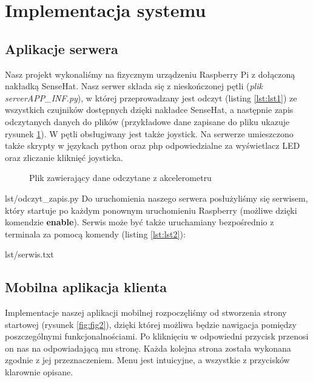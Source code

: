 \documentclass[11pt, a4paper]{article}
\begin{document}
\newpage

\section{Implementacja systemu}

\subsection{Aplikacje serwera}
Nasz projekt wykonaliśmy na fizycznym urządzeniu Raspberry Pi z dołączoną nakładką SenseHat. Nasz serwer składa się z nieskończonej pętli (\textit{plik serverAPP\_INF.py}), w której przeprowadzany jest odczyt (listing \ref{lst:lst1}) ze wszystkich czujników dostępnych dzięki nakładce SenseHat, a następnie zapis odczytanych danych do plików (przykładowe dane zapisane do pliku ukazuje rysunek \ref{fig:fig1}). W pętli obsługiwany jest także joystick. Na serwerze umieszczono także skrypty w językach python oraz php odpowiedzialne za wyświetlacz LED oraz zliczanie kliknięć joysticka. 

\begin{figure}[H]
	\caption{Plik zawierający dane odczytane z akcelerometru}
	\label{fig:fig1}
\end{figure}


{lst/odczyt_zapis.py}
Do uruchomienia naszego serwera posłużyliśmy się serwisem, który startuje po każdym ponownym uruchomieniu Raspberry (możliwe dzięki komendzie \textbf{enable}). Serwis może być także uruchamiany bezpośrednio z terminala za pomocą komendy (listing \ref{lst:lst2}):

{lst/serwis.txt}
\newpage

\subsection{Mobilna aplikacja klienta}
Implementacje naszej aplikacji mobilnej rozpoczęliśmy od stworzenia strony startowej (rysunek \ref{fig:fig2}), dzięki której możliwa będzie nawigacja pomiędzy poszczególnymi funkcjonalnościami. Po kliknięciu w odpowiedni przycisk przenosi on nas na odpowiadającą mu stronę. Każda kolejna strona została wykonana zgodnie z jej przeznaczeniem. Menu jest intuicyjne, a wszystkie z przycisków klarownie opisane.
\end{document}
